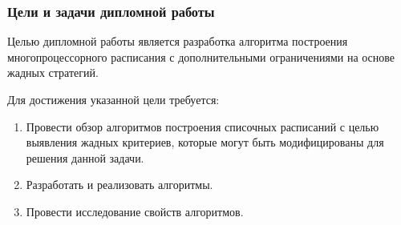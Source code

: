 \begin{frame}
    \frametitle{Цели и задачи дипломной работы}
    Целью дипломной работы является разработка алгоритма построения многопроцессорного расписания с дополнительными ограничениями на основе жадных стратегий.

    Для достижения указанной цели требуется:
    \begin{enumerate}
        \item Провести обзор алгоритмов построения списочных расписаний с целью выявления жадных критериев, которые могут быть модифицированы для решения данной задачи.
        \item Разработать и реализовать алгоритмы.
        \item Провести исследование свойств алгоритмов.
    \end{enumerate}
\end{frame}